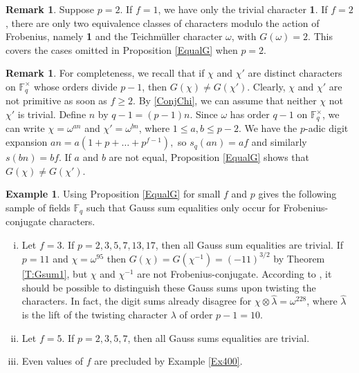 \documentclass[12pt]{amsart}  \usepackage{amsmath,amssymb,enumerate,amscd,tikz,url}
\numberwithin{equation}{section}
\theoremstyle{definition}
\newtheorem{Ex}[equation]{Example}
\newtheorem{Rem}[equation]{Remark}
\newcommand{\F}{{\mathbb F}}
\begin{document}
\begin{Rem}
Suppose $p=2$.  If $f = 1$, we have only the trivial character {\bf 1}.  If $f = 2$, there are only two equivalence classes of characters modulo the action of Frobenius, namely {\bf 1} and the Teichm\"{u}ller character $\omega$, with $G(\omega) = 2$.  This covers the cases omitted in Proposition \ref{EqualG} when $p=2$.
\end{Rem}

\begin{Rem} \label{f=1}
For completeness, we recall that if $\chi$ and $\chi'$ are distinct characters on $\F_q^\times$ whose orders divide $p-1$, then $G(\chi) \ne G(\chi')$.  Clearly, $\chi$ and $\chi'$ are not primitive as soon as $f \ge 2$.   By \eqref{ConjChi}, we can assume that neither $\chi$ not $\chi'$ is trivial.  Define $n$ by $q-1 = (p-1)n$.  Since $\omega$ has order $q-1$ on $\F_q^\times$, we can write $\chi = \omega^{an}$ and $\chi' = \omega^{bn}$, where $1 \le a,b \le p-2$.  We have the $p$-adic digit expansion
$
an = a(1+p+\dots+ p^{f-1}), 
$
so $s_q(an) = af$ and similarly $s(bn) = bf$.  If $a$ and $b$ are not equal, Proposition \ref{EqualG} shows that $G(\chi) \ne G(\chi')$.
\end{Rem}

\begin{Ex}\label{Ex100} 
Using Proposition \ref{EqualG} for small $f$ and $p$ gives the following sample of fields $\F_q$ such that Gauss sum equalities only occur for Frobenius-conjugate characters.
\begin{enumerate}[i)]
\item Let $f = 3$.  If $p = 2, 3, 5, 7, 13, 17$, then all Gauss sum equalities are trivial.  If $p = 11$ and $\chi = \omega^{95}$ then $G(\chi) = G(\chi^{-1}) = (-11)^{3/2}$ by Theorem \ref{T:Gsum1}, but $\chi$ and $\chi^{-1}$ are not Frobenius-conjugate.  According to \cite{NZY}, it should be possible to distinguish these Gauss sums upon twisting the characters.  In fact, the digit sums already disagree for  $\chi \otimes \widehat{\lambda} = \omega^{228}$, where $\widehat{\lambda}$ is the lift of the twisting character $\lambda$ of order $p-1=10$.

  \vspace{2 pt}

\item Let $f = 5$.  If $p = 2, 3, 5, 7$, then all Gauss sums equalities are trivial. 

 \vspace{2 pt}

\item Even values of $f$ are precluded by Example \ref{Ex400}. 
\end{enumerate}
\end{Ex}
\end{document}
